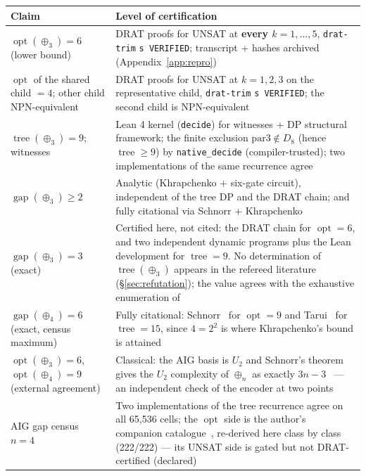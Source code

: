 \documentclass[11pt]{article}
\DeclareMathOperator{\opt}{opt}
\DeclareMathOperator{\tree}{tree}
\DeclareMathOperator{\gapop}{gap}
\theoremstyle{plain}
\begin{document}
\begin{table}[h]
\centering
\begin{tabularx}{\textwidth}{@{}p{}Y@{}}
\toprule
Claim & Level of certification \\
\midrule
$\opt(\oplus_3) = 6$ (lower bound) &
DRAT proofs for UNSAT at \textbf{every $k = 1,\dots,5$}, \texttt{drat-trim} \texttt{s VERIFIED};
transcript + hashes archived (Appendix~\ref{app:repro}) \\
\addlinespace
$\opt$ of the shared child $= 4$; other child NPN-equivalent &
DRAT proofs for UNSAT at $k = 1,2,3$ on the representative child, \texttt{drat-trim}
\texttt{s VERIFIED}; the second child is NPN-equivalent \\
\addlinespace
$\tree(\oplus_3) = 9$; witnesses &
Lean 4 kernel (\texttt{decide}) for witnesses + DP structural framework; the finite exclusion
$\mathrm{par3} \notin D_8$ (hence $\tree \ge 9$) by \texttt{native\_decide} (compiler-trusted); two
implementations of the same recurrence agree \\
\addlinespace
$\gapop(\oplus_3) \ge 2$ &
Analytic (Khrapchenko + six-gate circuit), independent of the tree DP and the DRAT chain; and
fully citational via Schnorr + Khrapchenko \\
\addlinespace
$\gapop(\oplus_3) = 3$ (exact) &
Certified here, not cited: the DRAT chain for $\opt = 6$, and two independent dynamic programs
plus the Lean development for $\tree = 9$. No determination of $\tree(\oplus_3)$ appears in the
refereed literature (\S\ref{sec:refutation}); the value agrees with the exhaustive enumeration
of~\cite{cox2011} \\
\addlinespace
$\gapop(\oplus_4) = 6$ (exact, census maximum) &
Fully citational: Schnorr~\cite{schnorr1974} for $\opt = 9$ and Tarui~\cite{tarui2010} for
$\tree = 15$, since $4 = 2^2$ is where Khrapchenko's bound is attained \\
\addlinespace
$\opt(\oplus_3) = 6$, $\opt(\oplus_4) = 9$ (external agreement) &
Classical: the AIG basis is $U_2$ and Schnorr's theorem gives the $U_2$ complexity of $\oplus_n$ as
exactly $3n-3$~\cite{schnorr1974} --- an independent check of the encoder at two points \\
\addlinespace
AIG gap census $n = 4$ &
Two implementations of the tree recurrence agree on all 65{,}536 cells; the $\opt$ side is the
author's companion catalogue~\cite{krinkin-catalog}, re-derived here class by class (222/222) --- its UNSAT
side is gated but not DRAT-certified (declared) \\

\end{tabularx}
\end{table}
\end{document}
